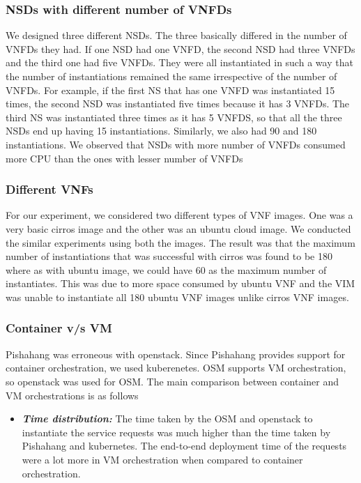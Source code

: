 \subsubsection{NSDs with different number of VNFDs}
We designed three different NSDs. The three  basically differed in the number of VNFDs they had. If one NSD had one VNFD, the second NSD had three VNFDs and the third one had five VNFDs. They were all instantiated in such a way that the number of instantiations remained the same irrespective of the number of VNFDs. For example, if the first NS that has one VNFD was instantiated 15 times, the second NSD was instantiated five times because it has 3 VNFDs. The third NS was instantiated three times as it has 5 VNFDS, so that all the three NSDs end up having 15 instantiations. Similarly, we also had 90 and 180 instantiations. We observed that NSDs with more number of VNFDs consumed more CPU than the ones with lesser number of VNFDs

\subsubsection{Different VNFs}

For our experiment, we considered two different types of VNF images. One was a very basic cirros image and the other was an ubuntu cloud image. We conducted the similar experiments using both the images. The result was that the maximum number of instantiations that was successful with cirros was found to be 180 where as with ubuntu image, we could have 60 as the maximum number of instantiates. This was due to more space consumed by ubuntu VNF and the VIM was unable to instantiate all 180 ubuntu VNF images unlike cirros VNF images.


\subsubsection{Container v/s VM}
Pishahang was erroneous with openstack. Since Pishahang provides support for container orchestration, we used kuberenetes. OSM supports VM orchestration, so openstack was used for OSM. The main comparison between container and VM orchestrations is as follows
\begin{itemize}
	\item \textbf{\textit{Time distribution:}}
	The time taken by the OSM and openstack to instantiate the service requests was much higher than the time taken by Pishahang and kubernetes. The end-to-end deployment time of the requests were a lot more in VM orchestration when compared to container orchestration.

	
\end{itemize}
